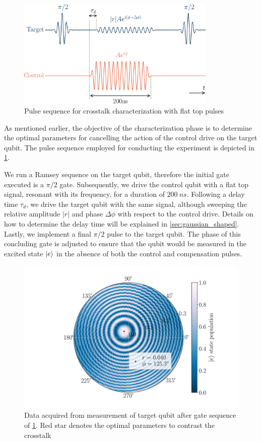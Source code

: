 \begin{figure}
    \centering
    \includegraphics[width=0.85\textwidth]{Images//Chap2.0/diagram_falttop.pdf}
    \caption{Pulse sequence for crosstalk characterization with flat top pulses}
    \label{fig:pulse_train_flattop}
\end{figure}

As mentioned earlier, the objective of the characterization phase is to determine the optimal parameters for cancelling the action of the control drive on the target qubit.
The pulse sequence employed for conducting the experiment is depicted in \cref{fig:pulse_train_flattop}.

We run a Ramsey sequence on the target qubit, therefore the initial gate executed is a $\pi/2$ gate.
Subsequently, we drive the control qubit with a flat top signal, resonant with its frequency, for a duration of $\SI{200}{ns}$. 
Following a delay time $\tau_d$, we drive the target qubit with the same signal, although sweeping the relative amplitude $|r|$ and phase $\Delta \phi$ with respect to the control drive. 
Details on how to determine the delay time will be explained in \cref{sec:gaussian_shaped}.
Lastly, we implement a final $\pi / 2$ pulse to the target qubit. The phase of this concluding gate is adjusted to ensure that the qubit would be measured in the excited state $\ket{e}$ in the absence of both the control and compensation pulses.

\begin{figure}[t!]
    \centering
    \includegraphics[width=0.9\linewidth]{Images//Chap2.0/circles.pdf}
    \vspace{-1cm}
    \caption{Data acquired from measurement of target qubit after gate sequence of \cref{fig:pulse_train_flattop}. Red star denotes the optimal parameters to contrast the crosstalk}
    \label{fig:circles_flat}
\end{figure}

